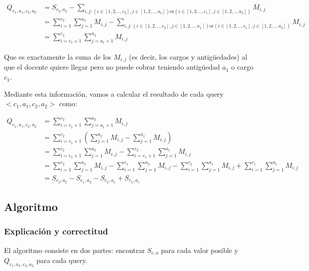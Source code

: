 \begin{equation*}
\begin{split}
    Q_{c_1,a_1,c_2,a_2} & = S_{c_2,a_2} - \sum_{i,j : (i \in [1,2,..,c_2], j \in [1,2,..,a_1]) \text{or}
    						(i \in [1,2,..,c_1], j \in [1,2,..,a_2])}^{}{M_{i,j}} \\
    					& = \sum_{i=1}^{c_2}{\sum_{j=1}^{a_2}{M_{i,j}}} - \sum_{i,j : (i \in [1,2,..,c_2], j \in [1,2,..,a_1]) \text{or}
    						(i \in [1,2,..,c_1], j \in [1,2,..,a_2])}^{}{M_{i,j}} \\
    					& = \sum_{i=c_1+1}^{c_2}{\sum_{j=a_1+1}^{a_2}{M_{i,j}}}
\end{split}
\end{equation*}

Que es exactamente la suma de los $M_{i,j}$ (es decir, los cargos y antigüedades) al que el docente
quiere llegar pero no puede cobrar teniendo antigüedad $a_1$ o cargo $c_1$.

Mediante esta información, vamos a calcular el resultado de cada query $<c_1, a_1, c_2, a_2>$ como:

\begin{equation*}
\begin{split}
    Q_{c_1,a_1,c_2,a_2} & = \sum_{i=c_1+1}^{c_2}{\sum_{j=a_1+1}^{a_2}{M_{i,j}}} \\
    					& = \sum_{i=c_1+1}^{c_2}{(\sum_{j=1}^{a_2}{M_{i,j}} - \sum_{j=1}^{a_1}{M_{i,j}})} \\
    					& = \sum_{i=c_1+1}^{c_2}{\sum_{j=1}^{a_2}{M_{i,j}}} - \sum_{i=c_1+1}^{c_2}{\sum_{j=1}^{a_1}{M_{i,j}}} \\
    					& = \sum_{i=1}^{c_2}{\sum_{j=1}^{a_2}{M_{i,j}}} - \sum_{i=1}^{c_1}{\sum_{j=1}^{a_2}{M_{i,j}}} -
    					\sum_{i=1}^{c_2}{\sum_{j=1}^{a_1}{M_{i,j}}} + \sum_{i=1}^{c_1}{\sum_{j=1}^{a_1}{M_{i,j}}} \\
    					& = S_{c_2,a_2} - S_{c_1,a_2} - S_{c_2,a_1} + S_{c_1,a_1}
\end{split}
\end{equation*}

\subsection{Algoritmo}

\subsubsection*{Explicación y correctitud}

El algoritmo consiste en dos partes: encontrar $S_{c,a}$ para cada valor posible y $Q_{c_1,a_1,c_2,a_2}$
para cada query.


